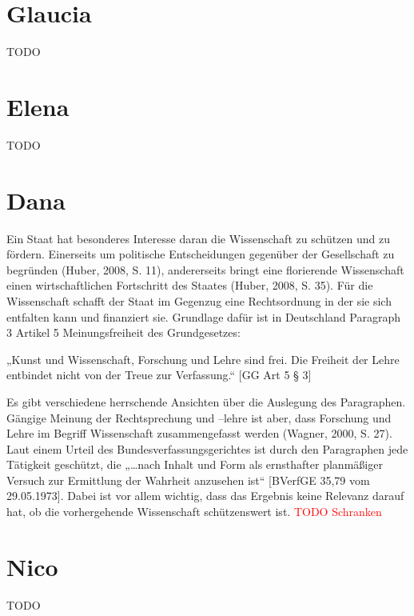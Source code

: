 \documentclass{pmwk}
\begin{document}
\Abgabeblatt{}{}{}{}




\section*{Glaucia}
TODO
\section*{Elena}
TODO
\section*{Dana}
Ein Staat hat besonderes Interesse daran die Wissenschaft zu schützen und zu fördern. Einerseits um politische Entscheidungen gegenüber der Gesellschaft zu begründen (Huber, 2008, S. 11), andererseits bringt eine florierende Wissenschaft einen wirtschaftlichen Fortschritt des Staates (Huber, 2008, S. 35). Für die Wissenschaft schafft der Staat im Gegenzug eine Rechtsordnung in der sie sich entfalten kann und finanziert sie. Grundlage dafür ist in Deutschland Paragraph 3 Artikel 5 Meinungsfreiheit des Grundgesetzes:\par
„Kunst und Wissenschaft, Forschung und Lehre sind frei. Die Freiheit der Lehre entbindet nicht von der Treue zur Verfassung.“ [GG Art 5 § 3]\par
Es gibt verschiedene herrschende Ansichten über die Auslegung des Paragraphen. Gängige Meinung der Rechtsprechung und –lehre ist aber, dass Forschung und Lehre im Begriff Wissenschaft zusammengefasst werden (Wagner, 2000, S. 27). Laut einem Urteil des Bundesverfassungsgerichtes ist durch den Paragraphen jede Tätigkeit geschützt, die „…nach Inhalt und Form als ernsthafter planmäßiger Versuch zur Ermittlung der Wahrheit anzusehen ist“ [BVerfGE 35,79 vom 29.05.1973]. Dabei ist vor allem wichtig, dass das Ergebnis keine Relevanz darauf hat, ob die vorhergehende Wissenschaft schützenswert ist. \textcolor{red}{TODO Schranken}

\section*{Nico}
TODO
\end{document}
